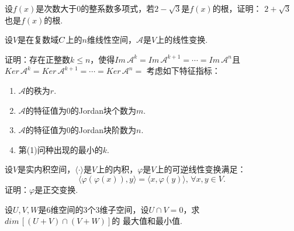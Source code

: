 \documentclass{BHCexam}[windows]
\let\mathbb\relax %
\begin{document}
\begin{groups}
        \begin{questions}
            \question
            设$f(x)$是次数大于0的整系数多项式，若$2-\sqrt{3}$是$f(x)$的根，证明：
            $2+\sqrt{3}$也是$f(x)$的根.
        \end{questions}

        \begin{questions}
            \question
            设$V$是在复数域$\mathbb{C}$上的$n$维线性空间，$\mathscr{A}$是$V$上的线性变换.
            \begin{subquestions}
                \subquestion 证明：存在正整数$k\leq n$，使得$Im \, \mathscr{A}^k = Im \, \mathscr{A}^{k+1} = \cdots = Im \, \mathscr{A}^n$且
                $Ker \, \mathscr{A}^k = Ker \, \mathscr{A}^{k+1}  =\cdots =  Ker \, \mathscr{A}^n = $
                \subquestion 考虑如下特征指标：
                \begin{enumerate}
                    \item $\mathscr{A}$的秩为$r$.
                    \item $\mathscr{A}$的特征值为0的Jordan块个数为$m$.
                    \item $\mathscr{A}$的特征值为0的Jordan块阶数为$n$.
                    \item 第(1)问种出现的最小的$k$.
                \end{enumerate}
            \end{subquestions}
        \end{questions}

        \begin{questions}
            \question
            设$V$是实内积空间，$\langle \cdot \rangle$是$V$上的内积，$\varphi$是$V$上的可逆线性变换满足：
            $$
                \langle \varphi \left(\varphi(x) \right) ,y \rangle = \langle x, \varphi(y)
                \rangle, \, \forall x,y \in V. 
            $$
            证明：$\varphi$是正交变换.
        \end{questions}

        \begin{questions}
            \question
            设$U,V,W$是6维空间的3个3维子空间，设$U \cap V = 0$，求$dim\,[(U+V) \cap (V+W)]$的
            最大值和最小值.
        \end{questions}


\end{groups}
\end{document}
